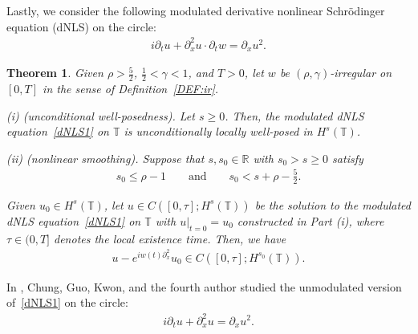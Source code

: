\documentclass[letterpaper, 11pt,  reqno]{amsart}
\newtheorem{theorem}{Theorem} [section]
\newcommand{\1}{\hspace{0.5mm}\text{I}\hspace{0.5mm}}
\newcommand{\noi}{\noindent}
\newcommand{\R}{\mathbb{R}}
\newcommand{\T}{\mathbb{T}}
\newcommand{\g}{\gamma}
\newcommand{\dx}{\partial_x}
\newcommand{\dt}{\partial_t}
\numberwithin{equation}{section}
\numberwithin{theorem}{section}
\begin{document}
Lastly, we consider the following modulated derivative 
nonlinear Schr\"odinger equation (dNLS) on the circle:
\begin{align}
i \dt u + \dx^2 u \cdot \dt w =  \dx u^2.
\label{dNLS1}
\end{align}









\begin{theorem}\label{THM:UU3}
Given $\rho > \frac 52$,  $\frac12< \g < 1$, and $T> 0$, 
let  $w$ be $(\rho,\g)$-irregular on $[0, T]$ in the sense of Definition~\ref{DEF:ir}.


\smallskip

\noi
\textup{(i) (unconditional well-posedness).} 
Let   $s\ge 0$.
Then, the modulated dNLS equation~\eqref{dNLS1}
on  $\T$
is unconditionally locally well-posed in $H^s(\T)$.

\smallskip

\noi
\textup{(ii) (nonlinear smoothing).} 
Suppose that 
$s, s_0 \in \R$ with 
$s_0 > s\ge 0$   satisfy
\begin{align*}
s_0 \le  \rho - 1
\qquad \text{and}\qquad 
s_0 < s + \rho - \frac 52.
\end{align*}



\noi
Given $u_0 \in H^s(\T)$, 
let $u
\in C([0, \tau]; H^s(\T))$ be the  solution 
to the modulated dNLS equation~\eqref{dNLS1}
on $\T$
with $u|_{t = 0} = u_0$
constructed in Part (i), 
where 
$\tau \in (0,  T]$ denotes the local existence time.
Then, we have 
\begin{align*}
 u - e^{i w(t) \dx^2}u_0 \in C([0, \tau]; H^{s_0}(\T)).
\end{align*}



\end{theorem}








In \cite{CGKO}, Chung, Guo, Kwon, and the fourth author
studied the unmodulated version of~\eqref{dNLS1} on the circle:
\begin{align}
i \dt u + \dx^2 u =  \dx u^2.
\label{dNLS0}
\end{align}
\end{document}
